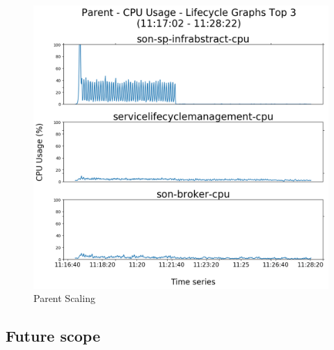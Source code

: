 \begin{figure}[h]
	\centering
	\includegraphics[width=0.7\linewidth]{figures/scalability_graphs/Scalability-Evaluation/Parent-TOP-3-Lifecycle}
	\caption{Parent Scaling}
	\label{fig:parent-top-3-lifecycle}
\end{figure}


\subsection{Future scope}